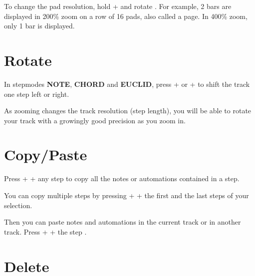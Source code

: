 

To change the pad resolution, hold  +  and rotate \encodericon{}. For example, 2 bars are displayed in 200\% zoom on a row of 16 pads, also called a page. In 400\% zoom, only 1 bar is displayed.





\section{Rotate}

In stepmodes \textbf{NOTE}, \textbf{CHORD} and \textbf{EUCLID}, press  + \btn{<} or  + \btn{>}  to shift the track one step left or right.

As zooming changes the track resolution (step length), you will be able to rotate your track with a growingly good precision as you zoom in.



\section{Copy/Paste}

Press  +  + any step \stepbystepicon{} to copy all the notes or automations contained in a step.

You can copy multiple steps by pressing   +  + the first and the last steps \stepbystepselectionicon{} of your selection.

Then you can paste notes and automations in the current track or in another track. Press   +  + the step \stepbystepicon{}.



\section{Delete}

